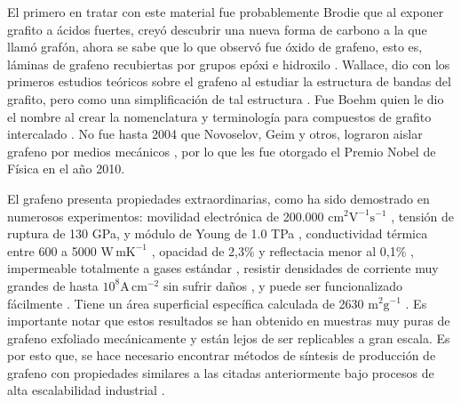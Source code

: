 El primero en tratar con este material fue probablemente Brodie \citep{Brodie1859} que al exponer grafito a ácidos fuertes, creyó descubrir una nueva forma de carbono a la que llamó grafón, ahora se sabe que lo que observó fue óxido de grafeno, esto es, láminas de grafeno recubiertas por grupos epóxi e hidroxilo \citep{Geim2012}. Wallace, dio con los primeros estudios teóricos sobre el grafeno al estudiar la estructura de bandas del grafito, pero como una simplificación de tal estructura \citep{Wallace1947}. Fue Boehm quien le dio el nombre al crear la nomenclatura y terminología para compuestos de grafito intercalado \citep{Boehm1986}. No fue hasta 2004 que Novoselov, Geim y otros, lograron aislar grafeno por medios mecánicos \citep{Novoselov2004}, por lo que les fue otorgado el Premio Nobel de Física en el año 2010.

El grafeno presenta propiedades extraordinarias, como ha sido demostrado en numerosos experimentos: movilidad electrónica de 200.000 $\mathrm{cm^2 V^{-1} s^{-1} }$ \citep{Bolotin2008}, tensión de ruptura de 130 GPa, y módulo de Young de 1.0 TPa \citep{Lee2008}, conductividad térmica entre 600 a 5000 $\mathrm{W\, mK^{-1}}$ \citep{Balandin2011}, opacidad de 2,3\% y reflectacia menor al 0,1\% \citep{Nair2008}, impermeable totalmente a gases estándar \citep{Bunch2008}, resistir densidades de corriente muy grandes de hasta $\mathrm{10^8 A\, cm^{-2}}$ sin sufrir daños  \citep{Moser2007}, y puede ser funcionalizado fácilmente \citep{Loh2010}. Tiene un área superficial específica calculada de 2630 $\mathrm{m^2 g^{-1}}$ \citep{Peigney2001}. Es importante notar que estos resultados se han obtenido en muestras muy puras de grafeno exfoliado mecánicamente \citep{Novoselov2004} y están lejos de ser replicables a gran escala. Es por esto que, se hace necesario encontrar métodos de síntesis de producción de grafeno con propiedades similares a las citadas anteriormente bajo procesos de alta escalabilidad industrial \citep{Novoselov2012}.


